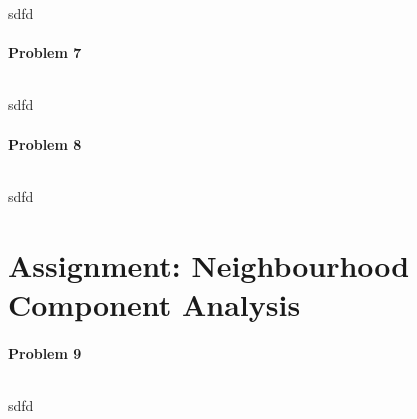 \documentclass{article}
\begin{document}
sdfd

\paragraph*{Problem 7}
$\;$ 

sdfd

\paragraph*{Problem 8}
$\;$ 

sdfd

\section{Assignment: Neighbourhood Component Analysis}

\paragraph*{Problem 9}
$\;$ 

sdfd
\end{document}
